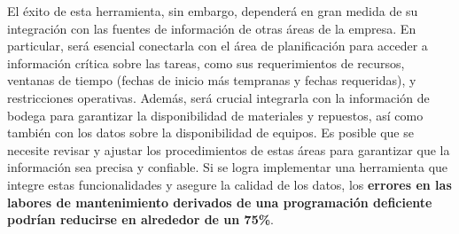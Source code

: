 \documentclass{article}
\begin{document}
\begin{appendix}
    El éxito de esta herramienta, sin embargo, dependerá en gran medida de su integración con las fuentes de información de otras áreas de la empresa. En particular, será esencial conectarla con el área de planificación para acceder a información crítica sobre las tareas, como sus requerimientos de recursos, ventanas de tiempo (fechas de inicio más tempranas y fechas requeridas), y restricciones operativas. Además, será crucial integrarla con la información de bodega para garantizar la disponibilidad de materiales y repuestos, así como también con los datos sobre la disponibilidad de equipos. Es posible que se necesite revisar y ajustar los procedimientos de estas áreas para garantizar que la información sea precisa y confiable. Si se logra implementar una herramienta que integre estas funcionalidades y asegure la calidad de los datos, los \textbf{errores en las labores de mantenimiento derivados de una programación deficiente podrían reducirse en alrededor de un 75\%}.
    
    
\end{appendix}
\end{document}
